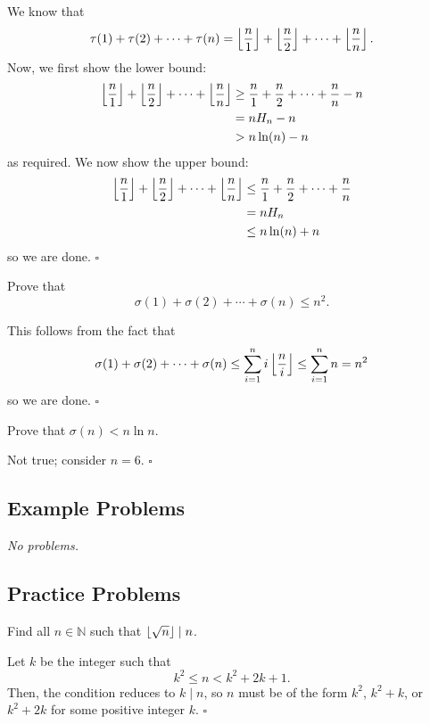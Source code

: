 \documentclass{article}
\newcommand{\noproblems}{\emph{No problems.}}
\begin{document}
We know that \[\tau(1) + \tau(2) + \cdots + \tau(n) = \left\lfloor \dfrac{n}{1} \right\rfloor+\left\lfloor \dfrac{n}{2} \right\rfloor+\cdots+\left\lfloor \dfrac{n}{n} \right\rfloor.\] Now, we first show the lower bound:
\begin{align*}
\left\lfloor \dfrac{n}{1} \right\rfloor+\left\lfloor \dfrac{n}{2} \right\rfloor+\cdots+\left\lfloor \dfrac{n}{n} \right\rfloor &\ge \dfrac{n}{1}+\dfrac{n}{2}+\cdots+\dfrac{n}{n}-n \\
&= nH_n-n \\
&> n\ln(n)-n
\end{align*}
as required. We now show the upper bound:
\begin{align*}
\left\lfloor \dfrac{n}{1} \right\rfloor+\left\lfloor \dfrac{n}{2} \right\rfloor+\cdots+\left\lfloor \dfrac{n}{n} \right\rfloor &\le \dfrac{n}{1}+\dfrac{n}{2}+\cdots+\dfrac{n}{n} \\
&= nH_n \\
&\le n\ln(n)+n
\end{align*}
so we are done. $\square$

\begin{problem}[3.5.5]{}
Prove that \[\sigma(1) + \sigma(2) + \cdots + \sigma(n) \le n^2.\]
\end{problem}

This follows from the fact that \[\sigma(1) + \sigma(2) + \cdots + \sigma(n) \le \sum_{i=1}^n i\left\lfloor \dfrac{n}{i} \right\rfloor \le \sum_{i=1}^n n = n^2\] so we are done. $\square$

\begin{problem}[3.5.6]{}
Prove that $\sigma(n) < n \ln n$.
\end{problem}

Not true; consider $n = 6$. $\square$

\subsection{Example Problems}

\noproblems

\subsection{Practice Problems}

\begin{problem}[3.7.1]{}
Find all $n \in \mathbb{N}$ such that $\left\lfloor \sqrt{n} \right\rfloor\mid n$.
\end{problem}

Let $k$ be the integer such that \[k^2 \le n < k^2+2k+1.\] Then, the condition reduces to $k \mid n$, so $n$ must be of the form $k^2$, $k^2+k$, or $k^2+2k$ for some positive integer $k$. $\square$
\end{document}
